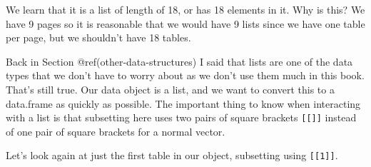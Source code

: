 \documentclass[
  a4paper,
]{krantz}
\begin{document}
We learn that it is a list of length of 18, or has 18
elements in it. Why is this? We have 9 pages so it is
reasonable that we would have 9 lists since we have one
table per page, but we shouldn't have 18 tables.

Back in Section @ref(other-data-structures) I said that
lists are one of the data types that we don't have to worry
about as we don't use them much in this book. That's still
true. Our data object is a list, and we want to convert this
to a data.frame as quickly as possible. The important thing
to know when interacting with a list is that subsetting here
uses two pairs of square brackets \texttt{{[}{[}{]}{]}}
instead of one pair of square brackets for a normal vector.

Let's look again at just the first table in our object,
subsetting using \texttt{{[}{[}1{]}{]}}.
\end{document}
